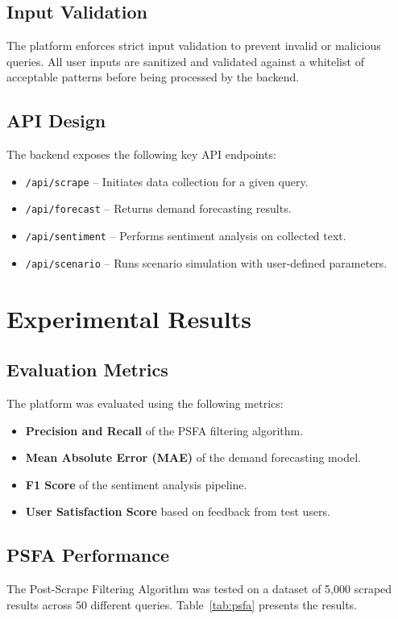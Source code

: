 \documentclass[conference]{IEEEtran}
\begin{document}
\subsection{Input Validation}
The platform enforces strict input validation to prevent invalid or malicious queries. All user inputs are sanitized and validated against a whitelist of acceptable patterns before being processed by the backend.

\subsection{API Design}
The backend exposes the following key API endpoints:
\begin{itemize}
    \item \texttt{/api/scrape} -- Initiates data collection for a given query.
    \item \texttt{/api/forecast} -- Returns demand forecasting results.
    \item \texttt{/api/sentiment} -- Performs sentiment analysis on collected text.
    \item \texttt{/api/scenario} -- Runs scenario simulation with user-defined parameters.
\end{itemize}

\section{Experimental Results}

\subsection{Evaluation Metrics}
The platform was evaluated using the following metrics:
\begin{itemize}
    \item \textbf{Precision and Recall} of the PSFA filtering algorithm.
    \item \textbf{Mean Absolute Error (MAE)} of the demand forecasting model.
    \item \textbf{F1 Score} of the sentiment analysis pipeline.
    \item \textbf{User Satisfaction Score} based on feedback from test users.
\end{itemize}

\subsection{PSFA Performance}
The Post-Scrape Filtering Algorithm was tested on a dataset of 5,000 scraped results across 50 different queries. Table~\ref{tab:psfa} presents the results.
\end{document}
